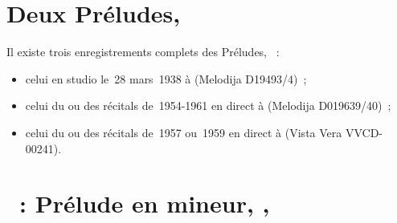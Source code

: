 \section*{%
Deux Préludes, }

Il existe trois enregistrements complets des Préludes, ~:
\begin{itemize}
 \item
 celui en studio le~28 mars~1938 à \Leningrad (Melodija D19493/4)~;
 \item
 celui du ou des récitals de~1954-1961 en direct à \MSHM (Melodija
 D019639/40)~;
 \item
 celui du ou des récitals de~1957 ou~1959 en direct à \MSHM (Vista Vera
 VVCD-00241).
\end{itemize}

\section{\ifChrono \Scriabine{}~: \fi
Prélude en \kG mineur,  , }
\label{\thesection}

